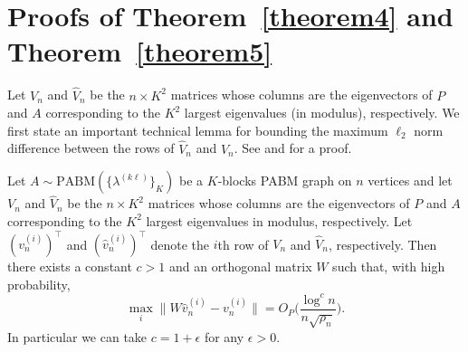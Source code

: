 \documentclass[12pt]{article}
\begin{document}
\hypertarget{proofs}{%
\section{Proofs of Theorem~\ref{theorem4} and Theorem~\ref{theorem5}}}
Let \(V_n\) and \(\hat{V}_n\)
be the $n \times K^2$ matrices whose columns are the eigenvectors of \(P\) and \(A\) corresponding to the
$K^2$ largest eigenvalues (in modulus), respectively. 
We first state an important technical lemma for bounding the maximum
$\ell_2$ norm difference between the rows of $\hat{V}_n$ and
$V_n$. See \cite{cape_biometrika} and 
\cite[Lemma~5]{rubindelanchy2017statistical} for a proof. 
\begin{lemma}
  \label{lem:technical}
Let $A \sim \mathrm{PABM}(\{\lambda^{(k \ell)}\}_{K})$ be a $K$-blocks
PABM graph on $n$ vertices and let \(V_n\) and \(\hat{V}_n\)
be the $n \times K^2$ matrices whose columns are the eigenvectors of \(P\) and \(A\) corresponding to the
$K^2$ largest eigenvalues in modulus, respectively.
Let \((v_n^{(i)})^\top\) and \((\hat{v}_n^{(i)})^\top\) denote the $i$th 
row of \(V_n\) and \(\hat{V}_n\), respectively. 
Then there exists a constant $c > 1$ and an orthogonal matrix $W$ such
that, with high probability,
$$\max_{i} \|W \hat{v}_n^{(i)} - v_n^{(i)}\|  = O_P \Big(\frac{\log^{c}n}{n \sqrt{\rho_n}} \Big).$$
In particular we can take $c = 1 + \epsilon$ for any $\epsilon > 0$. 
\end{lemma}


%
\end{document}
